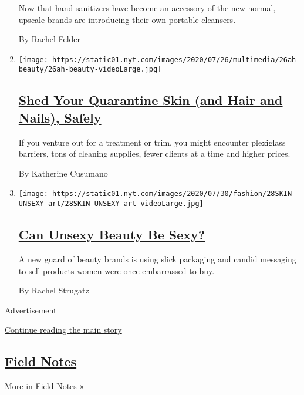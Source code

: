 \begin{enumerate}
  Now that hand sanitizers have become an accessory of the new normal,
  upscale brands are introducing their own portable cleansers.

  By Rachel Felder
\item
  \texttt{[image: https://static01.nyt.com/images/2020/07/26/multimedia/26ah-beauty/26ah-beauty-videoLarge.jpg]}

  \hypertarget{shed-your-quarantine-skin-and-hair-and-nails-safely}{%
  \subsection{\texorpdfstring{\href{/2020/07/25/at-home/coronavirus-salons.html}{Shed
  Your Quarantine Skin (and Hair and Nails),
  Safely}}{Shed Your Quarantine Skin (and Hair and Nails), Safely}}\label{shed-your-quarantine-skin-and-hair-and-nails-safely}}

  If you venture out for a treatment or trim, you might encounter
  plexiglass barriers, tons of cleaning supplies, fewer clients at a
  time and higher prices.

  By Katherine Cusumano
\item
  \texttt{[image: https://static01.nyt.com/images/2020/07/30/fashion/28SKIN-UNSEXY-art/28SKIN-UNSEXY-art-videoLarge.jpg]}

  \hypertarget{can-unsexy-beauty-be-sexy}{%
  \subsection{\texorpdfstring{\href{/2020/07/28/style/can-unsexy-beauty-be-sexy.html}{Can
  Unsexy Beauty Be
  Sexy?}}{Can Unsexy Beauty Be Sexy?}}\label{can-unsexy-beauty-be-sexy}}

  A new guard of beauty brands is using slick packaging and candid
  messaging to sell products women were once embarrassed to buy.

  By Rachel Strugatz
\end{enumerate}

Advertisement

\protect\hyperlink{after-mid3}{Continue reading the main story}

\hypertarget{field-notes-2}{%
\subsection{\texorpdfstring{\href{/column/field-notes}{Field
Notes}}{Field Notes}}\label{field-notes-2}}

\href{/column/field-notes}{More in Field Notes »}

